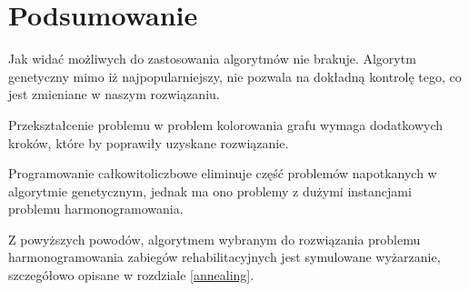 \section{Podsumowanie}
Jak widać możliwych do zastosowania algorytmów nie brakuje. Algorytm genetyczny
mimo iż najpopularniejszy, nie pozwala na dokładną kontrolę tego, co jest
zmieniane w naszym rozwiązaniu.

Przekształcenie problemu w problem kolorowania grafu wymaga dodatkowych kroków,
które by poprawiły uzyskane rozwiązanie.

Programowanie całkowitoliczbowe eliminuje część problemów napotkanych w
algorytmie genetycznym, jednak ma ono problemy z dużymi instancjami problemu
harmonogramowania.

Z powyższych powodów, algorytmem wybranym do rozwiązania problemu
harmonogramowania zabiegów rehabilitacyjnych jest symulowane wyżarzanie,
szczegółowo opisane w rozdziale \ref{annealing}.
